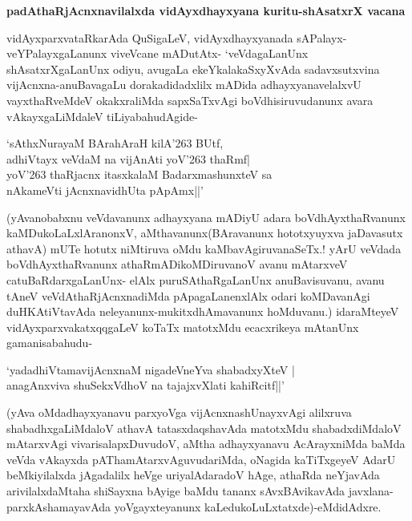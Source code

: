 \noindent
\textbf{padAthaRjAcnxnavilalxda vidAyxdhayxyana kuritu-shAsatxrX vacana}\label{page39}

vidAyxparxvataRkarAda QuSigaLeV, vidAyxdhayxyanada sAPalayx-veYPalayxgaLanunx viveVcane mADutAtx- `veVdagaLanUnx shAsatxrXgaLanUnx odiyu, avugaLa ekeYkalakaSxyXvAda sadavxsutxvina vijAcnxna-anuBavagaLu dorakadidadxlilx mADida adhayxyanavelalxvU vayxthaRveMdeV okakxraliMda sapxSaTxvAgi boVdhisiruvudanunx
avara vAkayxgaLiMdaleV tiLiyabahudAgide-

\begin{shloka}
`sAthxNurayaM BArahAraH kilA\char'263 BUtf,\\\label{39}
adhiVtayx veVdaM na vijAnAti yoV\char'263 thaRmf|\\
yoV\char'263 thaRjacnx itasxkalaM BadarxmashunxteV sa\\
nAkameVti jAcnxnavidhUta pApAmx||'
\end{shloka}

(yAvanobabxnu veVdavanunx adhayxyana mADiyU adara boVdhAyxthaRvanunx kaMDukoLaLxlAranonxV, aMthavanunx(BAravanunx hototxyuyxva jaDavasutx athavA) mUTe hotutx niMtiruva oMdu kaMbavAgiruvanaSeTx.! yArU veVdada boVdhAyxthaRvanunx athaRmADikoMDiruvanoV avanu mAtarxveV catuBaRdarxgaLanUnx- elAlx puruSAthaRgaLanUnx anuBavisuvanu, avanu tAneV veVdAthaRjAcnxnadiMda pApagaLanenxlAlx odari koMDavanAgi duHKAtiVtavAda neleyanunx-mukitxdhAmavanunx hoMduvanu.) idaraMteyeV vidAyxparxvakatxqqgaLeV koTaTx matotxMdu ecacxrikeya mAtanUnx gamanisabahudu-

\begin{shloka}
`yadadhiVtamavijAcnxnaM nigadeVneYva shabadxyXteV |\\\label{39}
anagAnxviva shuSekxVdhoV na tajajxvXlati kahiRcitf||'
\end{shloka}

(yAva oMdadhayxyanavu parxyoVga vijAcnxnashUnayxvAgi alilxruva shabadhxgaLiMdaloV athavA tatasxdaqshavAda matotxMdu shabadxdiMdaloV mAtarxvAgi vivarisalapxDuvudoV, aMtha adhayxyanavu AcArayxniMda baMda veVda vAkayxda pAThamAtarxvAguvudariMda, oNagida kaTiTxgeyeV AdarU beMkiyilalxda jAgadalilx heVge uriyalAdaradoV hAge, athaRda neYjavAda arivilalxdaMtaha shiSayxna bAyige baMdu tananx sAvxBAvikavAda javxlana-parxkAshamayavAda yoVgayxteyanunx kaLedukoLuLxtatxde)-eMdidAdxre.

